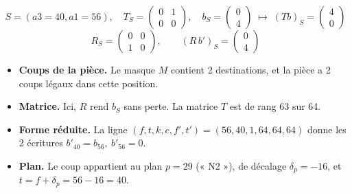 \[ S = (a3=40, a1=56),\quad T_S = \begin{pmatrix}0 & 1 \\ 0 & 0\end{pmatrix},\quad b_S = \begin{pmatrix}0 \\ 4\end{pmatrix}\;\longmapsto\; (Tb)_S =\begin{pmatrix}4 \\ 0\end{pmatrix} \]
\[ R_S = \begin{pmatrix}0 & 0 \\ 1 & 0\end{pmatrix},\qquad (R\,b')_S = \begin{pmatrix}0 \\ 4\end{pmatrix} \]
\begin{itemize}
\item \textbf{Coups de la pièce.} Le masque $M$ contient 2 destinations, et la pièce a 2 coups légaux dans cette position.
\item \textbf{Matrice.} Ici, $R$ rend $b_S$ sans perte. La matrice $T$ est de rang 63 sur 64.
\item \textbf{Forme réduite.} La ligne $(f, t, k, c, f', t') = (56, 40, 1, 64, 64, 64)$ donne les 2 écritures $b'_{40} = b_{56},\ b'_{56} = 0$.
\item \textbf{Plan.} Le coup appartient au plan $p = 29$ (« N2 »), de décalage $\delta_p = -16$, et $t = f + \delta_p = 56 -16 = 40$.
\end{itemize}
